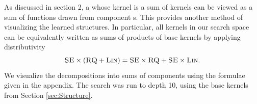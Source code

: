 \documentclass[twoside]{article}
\begin{document}
As discussed in section 2, a \gp{} whose kernel is a sum of kernels can be viewed as a sum of functions drawn from component \gp{}s.
This provides another method of visualizing the learned structures.
In particular, all kernels in our search space can be equivalently written as sums of products of base kernels by applying distributivity \eg
\[{\textsc{SE} \times (\textsc{RQ} + \textsc{Lin}) = \textsc{SE} \times \textsc{RQ} + \textsc{SE} \times \textsc{Lin}}.\]
We visualize the decompositions into sums of components using the formulae given in the appendix.
%
%
%
%
%
The search was run to depth 10, using the base kernels from Section \ref{sec:Structure}.



\end{document}
